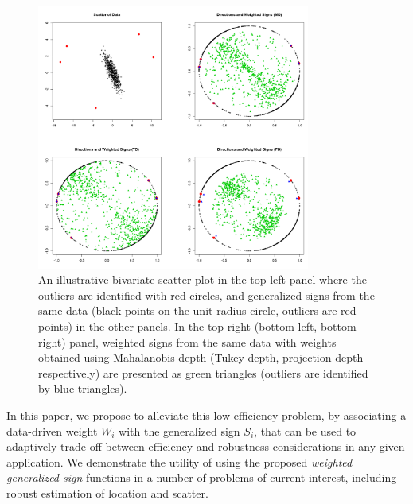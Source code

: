 \begin{figure}[t]
\begin{center}
\includegraphics[width=0.8\textwidth]{plot1}
\caption{
An illustrative bivariate scatter plot in the top left panel where the outliers are 
identified with red circles, 
and generalized signs from the same data (black points on the 
unit radius circle, outliers are red points) in the other panels. 
In the top right (bottom left, bottom right) 
panel, weighted signs from the same data with weights obtained using Mahalanobis depth 
(Tukey depth, projection depth respectively) are presented as green triangles 
(outliers are identified by blue triangles). 
}
\label{fig:Fig1}
\end{center}
\end{figure}

In this paper, we propose to alleviate this low efficiency problem, by associating 
a data-driven weight $W_{i}$ with the generalized sign $S_{i}$, that can be used 
to adaptively trade-off between efficiency and robustness considerations in any given 
application. We demonstrate the utility of using 
the proposed \textit{weighted generalized sign} functions in a number of problems 
of current interest, including robust estimation of location and scatter.

